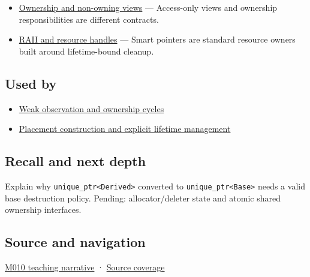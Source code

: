 \begin{itemize}
\tightlist
\item
  \hyperref[appendix-d52e4486f527]{Ownership and non-owning views} --- Access-only views and ownership responsibilities are different contracts.
\item
  \hyperref[appendix-69739d3ab49b]{RAII and resource handles} --- Smart pointers are standard resource owners built around lifetime-bound cleanup.
\end{itemize}

\subsection{Used by}\label{appendix-51602cabe815-used-by}

\hypertarget{appendix-51602cabe815-used-by}{}

\begin{itemize}
\tightlist
\item
  \hyperref[appendix-b9548675eb2b]{Weak observation and ownership cycles}
\item
  \hyperref[appendix-f56c3e43fd4e]{Placement construction and explicit lifetime management}
\end{itemize}

\subsection{Recall and next depth}\label{appendix-51602cabe815-recall-and-next-depth}

\hypertarget{appendix-51602cabe815-recall-and-next-depth}{}

Explain why \texttt{unique\_ptr\textless{}Derived\textgreater{}} converted to \texttt{unique\_ptr\textless{}Base\textgreater{}} needs a valid base destruction policy. Pending: allocator/deleter state and atomic shared ownership interfaces.

\subsection{Source and navigation}\label{appendix-51602cabe815-source-and-navigation}

\hypertarget{appendix-51602cabe815-source-and-navigation}{}

\hyperref[01-foundations-i-ch004-exclusive-ownership-unique_ptr-makes-transfer-visible]{M010 teaching narrative} · \hyperref[appendix-fd090d982a15-m010---parts-148-160]{Source coverage}

